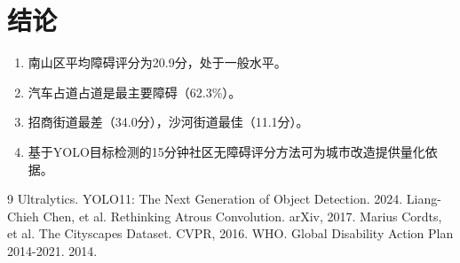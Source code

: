 \documentclass{article}
\begin{document}
\section{结论}

\begin{enumerate}
\item 南山区平均障碍评分为20.9分，处于一般水平。
\item 汽车占道占道是最主要障碍（62.3\%）。
\item 招商街道最差（34.0分），沙河街道最佳（11.1分）。
\item 基于YOLO目标检测的15分钟社区无障碍评分方法可为城市改造提供量化依据。
\end{enumerate}

\begin{thebibliography}{9}
 Ultralytics. YOLO11: The Next Generation of Object Detection. 2024.
 Liang-Chieh Chen, et al. Rethinking Atrous Convolution. arXiv, 2017.
 Marius Cordts, et al. The Cityscapes Dataset. CVPR, 2016.
 WHO. Global Disability Action Plan 2014-2021. 2014.
\end{thebibliography}
\end{document}
